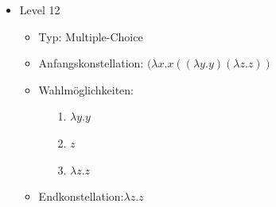 \begin{itemize}
	\item{Level 12} 
		\begin{itemize}
			\item{Typ:} Multiple-Choice 
			\item{Anfangskonstellation:} \((\lambda x . x ((\lambda y . y) (\lambda z . z ) ) \)    
			\item{Wahlmöglichkeiten:}  
				\begin{itemize}
					\item[1.] \( \lambda y . y\) 
					\item[2.] \( z \) 
					\item[3.] \(\lambda z . z \)
				\end{itemize}
			\item{Endkonstellation:}\( \lambda z . z\)
		\end{itemize}


\end{itemize}
